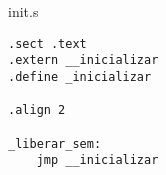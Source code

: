 init.s

\begin{verbatim}
.sect .text
.extern __inicializar
.define _inicializar

.align 2

_liberar_sem:
	jmp __inicializar
\end{verbatim}
